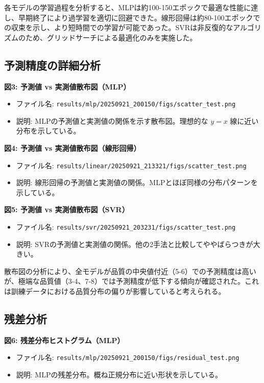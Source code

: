 \documentclass[12pt,a4paper,dvipdfmx]{jsarticle}
\begin{document}
各モデルの学習過程を分析すると、MLPは約100-150エポックで最適な性能に達し、早期終了により過学習を適切に回避できた。線形回帰は約80-100エポックでの収束を示し、より短時間での学習が可能であった。SVRは非反復的なアルゴリズムのため、グリッドサーチによる最適化のみを実施した。

\subsection{予測精度の詳細分析}

\textbf{図3: 予測値 vs 実測値散布図（MLP）}
\begin{itemize}
    \item ファイル名: \texttt{results/mlp/20250921\_200150/figs/scatter\_test.png}
    \item 説明: MLPの予測値と実測値の関係を示す散布図。理想的な $y=x$ 線に近い分布を示している。
\end{itemize}

\textbf{図4: 予測値 vs 実測値散布図（線形回帰）}
\begin{itemize}
    \item ファイル名: \texttt{results/linear/20250921\_213321/figs/scatter\_test.png}
    \item 説明: 線形回帰の予測値と実測値の関係。MLPとほぼ同様の分布パターンを示している。
\end{itemize}

\textbf{図5: 予測値 vs 実測値散布図（SVR）}
\begin{itemize}
    \item ファイル名: \texttt{results/svr/20250921\_203231/figs/scatter\_test.png}
    \item 説明: SVRの予測値と実測値の関係。他の2手法と比較してややばらつきが大きい。
\end{itemize}

散布図の分析により、全モデルが品質の中央値付近（5-6）での予測精度は高いが、極端な品質値（3-4、7-8）では予測精度が低下する傾向が確認された。これは訓練データにおける品質分布の偏りが影響していると考えられる。

\subsection{残差分析}

\textbf{図6: 残差分布ヒストグラム（MLP）}
\begin{itemize}
    \item ファイル名: \texttt{results/mlp/20250921\_200150/figs/residual\_test.png}
    \item 説明: MLPの残差分布。概ね正規分布に近い形状を示している。
\end{itemize}
\end{document}
